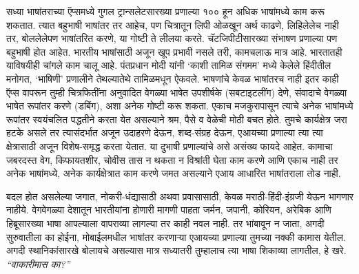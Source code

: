 सध्या भाषांतराच्या ऍप्समध्ये गुगल ट्रान्सलेटसारख्या प्रणाल्या १०० हून अधिक भाषांमध्ये काम करू शकतात. त्यात बहुभाषी भाषांतर तर आहेच, पण चित्रातून लिपी ओळखून अर्थ काढणे, लिहिलेलेच नाही तर, बोललेलेपण भाषांतरित करणे, या गोष्टी ते लीलया करते. चॅटजिपीटीसारख्या संभाषण प्रणाल्या पण बहुभाषी होत आहेत. भारतीय भाषांसाठी अजून खूप प्रभावी नसले तरी, कामचलाऊ मात्र आहे. भारतातही याविषयीही चांगले काम चालू आहे. पंतप्रधान मोदी यांनी `काशी तामिळ संगमम' मध्ये केलेले हिंदीतील मनोगत, `भाषिणी' प्रणालीने तेथल्यातेथे तामिळमधून ऐकवले.  भाषणांचे केवळ भाषांतरच नाही इतर काही ऍप्स वापरून तुम्ही चित्रफितींना अनुवादित वेगळ्या भाषेत उपशीर्षके (सबटाइटलींग) देणे, संवादाचे वेगळ्या भाषेत रूपांतर करणे (डबिंग), अशा अनेक गोष्टी करू शकता. एकाच मजकुरापासून त्याचे अनेक भाषांमध्ये रूपांतर स्वयंचलित पद्धतीने करता येत असल्याने श्रम, पैसे व वेळेची मोठी बचत होते. तुमचे कार्यक्षेत्र जरा हटके असले तर त्यासंदर्भात अजून उदाहरणे देऊन, शब्द-संग्रह देऊन, एआयच्या प्रणाल्या त्या त्या क्षेत्रासाठी अजून विशेष-समृद्ध करता येतात. या दुभाषी प्रणाल्यांचे असे असंख्य फायदे आहेत. कामाचा जबरदस्त वेग, किफायतशीर, चोवीस तास न थकता न विश्रांती घेता काम करणे आणि एकाच नाही तर अनेक भाषांमध्ये, अनेक कार्यक्षेत्रात काम करणे जमत असल्याने एआय आधारित भाषांतराला तोड नाही.

बदल होत असलेल्या जगात, नोकरी-धंद्यासाठी अथवा प्रवासासाठी, केवळ मराठी-हिंदी-इंग्रजी येऊन भागणार नाहीये. वेगवेगळ्या देशातून भारतीयांना होणारी मागणी पाहता जर्मन, जपानी, कोरियन, अरेबिक आणि हिब्रूसारख्या भाषा आपल्याला वापराव्या लागल्या तर काही नवल नाही. तर भांबावून न जाता, अगदी सुरुवातीला का होईना, मोबाईलमधील भाषांतर करणाऱ्या एआयच्या प्रणाल्या तुमच्या नक्की कामास येतील. अगदी स्थानिकांसारखे बोलायचे असल्यास मात्र सध्यातरी तुम्हालाच त्या भाषा शिकाव्या लागतील, हे खरे. {\textit{``वाकारीमास का?''}} %